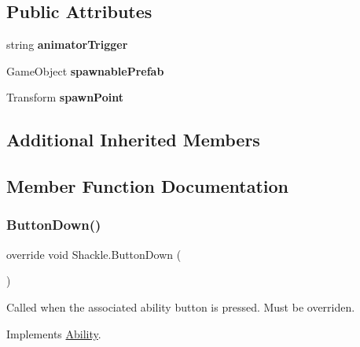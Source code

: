 \subsection*{Public Attributes}
\begin{DoxyCompactItemize}
\item 
\hypertarget{class_shackle_a00f592608de2d590fe2ce569e35a4ea8}{}\label{class_shackle_a00f592608de2d590fe2ce569e35a4ea8} 
string {\bfseries animator\+Trigger}
\item 
\hypertarget{class_shackle_a79dd6bf230e5acb534b9d33743cea17e}{}\label{class_shackle_a79dd6bf230e5acb534b9d33743cea17e} 
Game\+Object {\bfseries spawnable\+Prefab}
\item 
\hypertarget{class_shackle_add0abd65e4f4212b13914806c83e47f4}{}\label{class_shackle_add0abd65e4f4212b13914806c83e47f4} 
Transform {\bfseries spawn\+Point}
\end{DoxyCompactItemize}
\subsection*{Additional Inherited Members}


\subsection{Member Function Documentation}
\hypertarget{class_shackle_a19ae419f51b201f85310105c4fb2ca87}{}\label{class_shackle_a19ae419f51b201f85310105c4fb2ca87} 
\subsubsection{\texorpdfstring{Button\+Down()}{ButtonDown()}}
{\footnotesize\ttfamily override void Shackle.\+Button\+Down (\begin{DoxyParamCaption}{ }\end{DoxyParamCaption})\hspace{0.3cm}{\ttfamily [virtual]}}



Called when the associated ability button is pressed. Must be overriden. 



Implements \hyperlink{class_ability_a7722265862f8b29828315725415ce266}{Ability}.

\hypertarget{class_shackle_a81c2ef10a06ceab879574d3162dd7580}{}\label{class_shackle_a81c2ef10a06ceab879574d3162dd7580} 
